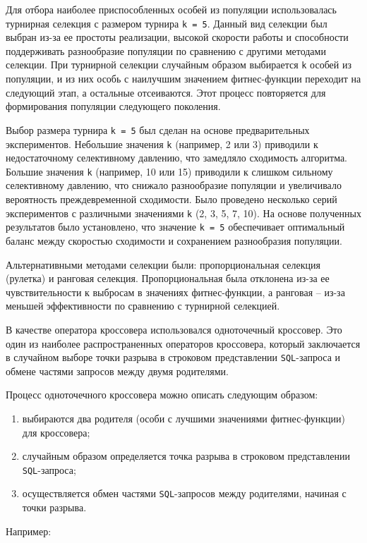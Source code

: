 \documentclass[master,paper]{pmk-graduate}
\begin{document}
Для отбора наиболее приспособленных особей из популяции использовалась турнирная селекция с размером турнира \texttt{k = 5}. Данный вид селекции был выбран из-за ее простоты реализации, высокой скорости работы и способности поддерживать разнообразие популяции по сравнению с другими методами селекции. При турнирной селекции случайным образом выбирается \texttt{k} особей из популяции, и из них особь с наилучшим значением фитнес-функции переходит на следующий этап, а остальные отсеиваются. Этот процесс повторяется для формирования популяции следующего поколения.

Выбор размера турнира \texttt{k = 5} был сделан на основе предварительных экспериментов. Небольшие значения \texttt{k} (например, 2 или 3) приводили к недос\-таточному селективному давлению, что замедляло сходимость алгоритма. Большие значения \texttt{k} (например, 10 или 15) приводили к слишком сильному селективному давлению, что снижало разнообразие популяции и увеличивало вероятность преждевременной сходимости. Было проведено несколько серий экспериментов с различными значениями \texttt{k} (2, 3, 5, 7, 10). На основе полученных результатов было установлено, что значение \texttt{k = 5} обеспечивает оптимальный баланс между скоростью сходимости и сохранением разнообразия популяции.

Альтернативными методами селекции были: пропорциональная селекция (рулетка) и ранговая селекция. Пропорциональная была отклонена из-за ее чувствительности к выбросам в значениях фитнес-функции, а ранговая -- из-за меньшей эффективности по сравнению с турнирной селекцией.

В качестве оператора кроссовера использовался одноточечный кроссовер. Это один из наиболее распространенных операторов кроссовера, который зак\-лючается в случайном выборе точки разрыва в строковом представлении \texttt{SQL}-запроса и обмене частями запросов между двумя родителями.

Процесс одноточечного кроссовера можно описать следующим образом:
\begin{enumerate}
\item выбираются два родителя (особи с лучшими значениями фитнес-функ\-ции) для кроссовера;
\item случайным образом определяется точка разрыва в строковом представлении \texttt{SQL}-запроса;
\item осуществляется обмен частями \texttt{SQL}-запросов между родителями, начиная с точки разрыва.
\end{enumerate}
Например:
\end{document}
